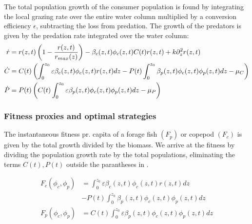 The total population growth of the consumer population is found by integrating the local grazing rate over the entire water column multiplied by a conversion efficiency $\epsilon$, subtracting the loss from predation. The growth of the predators is given by the predation rate integrated over the water column:
\begin{align}
	\dot{r} &= r(z,t)\pa{1-\frac{r(z,t)}{r_{max}(z)}} - \beta_c(z,t)\phi_c(z,t)C(t) r(z,t)  + k \partial_z^2 r(z,t)\\
	\dot{C} &= C(t)\left ( \int_0^{z_0} \varepsilon \beta_c(z,t)\phi_c(z,t)r(z,t) dz- P(t)\int_0^{z_0} \beta_p(z,t) \phi_c(z,t) \phi_p(z,t) dz - \mu_C \right ) \\
	\dot{P} &= P(t) \left ( C(t )\int_0^{z_0} \varepsilon \beta_p(z,t) \phi_c(z,t)\phi_p(z,t) dz - \mu_P \right )
  \label{eq:population_growth_prob_dens}
\end{align}


\subsubsection*{Fitness proxies and optimal strategies}

The instantaneous fitness pr. capita of a forage fish $(F_p)$ or copepod $(F_c)$ is given by the total growth divided by the biomass. We arrive at the fitness by dividing the population growth rate  by the total populations, eliminating the terms $C(t), P(t)$ outside the parantheses in .

\begin{align}
	F_c(\phi_c, \phi_p) &= \int_0^{z_0} \varepsilon \beta_c(z,t)\phi_c(z,t)r(z,t) dz\\ &- P(t)\int_0^{z_0} \beta_p(z,t) \phi_c(z,t) \phi_p(z,t)dz \\
	F_p(\phi_c, \phi_p) &=  C(t) \int_0^{z_0} \varepsilon \beta_p(z,t)\phi_c(z,t)\phi_p(z,t) dz
  \label{eq:fitness}
\end{align}

